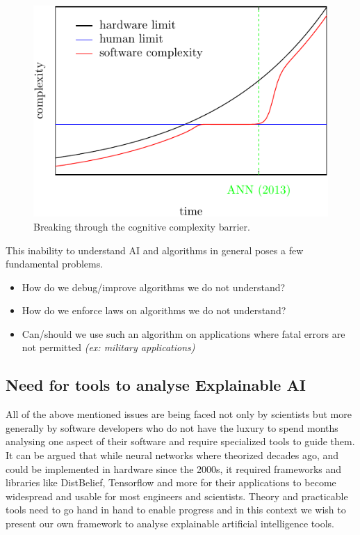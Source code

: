 \begin{figure}[H]
    \centering
    \includegraphics[width=0.8\linewidth]{images/01_Intro/Complexity.pdf}
    \caption{Breaking through the cognitive complexity barrier.}
    \label{fig:complexity}
\end{figure}

This inability to understand AI and algorithms in general poses a few fundamental problems.

\begin{itemize}
    \item How do we debug/improve algorithms we do not understand?
    \item How do we enforce laws on algorithms we do not understand?
    \item Can/should we use such an algorithm on applications where fatal errors are not permitted \textit{(ex: military applications)}
\end{itemize}



\subsection{Need for tools to analyse Explainable AI}

All of the above mentioned issues are being faced not only by scientists but more generally by software developers who do not have the luxury to spend months analysing one aspect of their software and require specialized tools to guide them. It can be argued that while neural networks where theorized decades ago, and could be implemented in hardware since the 2000s, it required frameworks and libraries like DistBelief, Tensorflow and more for their applications to become widespread and usable for most engineers and scientists. Theory and practicable tools need to go hand in hand to enable progress and in this context we wish to present our own framework to analyse explainable artificial intelligence tools.


